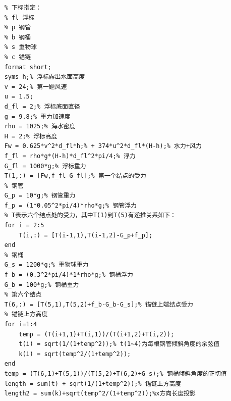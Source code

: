 \documentclass{cumcm}
\begin{document}
\begin{lstlisting}
	% 下标指定：
	% fl 浮标
	% p 钢管
	% b 钢桶
	% s 重物球
	% c 锚链
	format short;
	syms h;% 浮标露出水面高度
	v = 24;% 第一题风速
	u = 1.5;
	d_fl = 2;% 浮标底面直径
	g = 9.8;% 重力加速度
	rho = 1025;% 海水密度
	H = 2;% 浮标高度
	Fw = 0.625*v^2*d_fl*h;% + 374*u^2*d_fl*(H-h);% 水力+风力
	f_fl = rho*g*(H-h)*d_fl^2*pi/4;% 浮力
	G_fl = 1000*g;% 浮标重力
	T(1,:) = [Fw,f_fl-G_fl];% 第一个结点的受力
	% 钢管
	G_p = 10*g;% 钢管重力
	f_p = (1*0.05^2*pi/4)*rho*g;% 钢管浮力
	% T表示六个结点处的受力，其中T(1)到T(5)有递推关系如下：
	for i = 2:5
	    T(i,:) = [T(i-1,1),T(i-1,2)-G_p+f_p];
	end
	% 钢桶
	G_s = 1200*g;% 重物球重力
	f_b = (0.3^2*pi/4)*1*rho*g;% 钢桶浮力
	G_b = 100*g;% 钢桶重力
	% 第六个结点
	T(6,:) = [T(5,1),T(5,2)+f_b-G_b-G_s];% 锚链上端结点受力
	% 锚链上方高度
	for i=1:4
	    temp = (T(i+1,1)+T(i,1))/(T(i+1,2)+T(i,2));
	    t(i) = sqrt(1/(1+temp^2));% t(1~4)为每根钢管倾斜角度的余弦值
	    k(i) = sqrt(temp^2/(1+temp^2));
	end
	temp = (T(6,1)+T(5,1))/(T(5,2)+T(6,2)+G_s);% 钢桶倾斜角度的正切值
	length = sum(t) + sqrt(1/(1+temp^2));% 锚链上方高度
	length2 = sum(k)+sqrt(temp^2/(1+temp^2));%x方向长度投影


\end{lstlisting}
\end{document}
